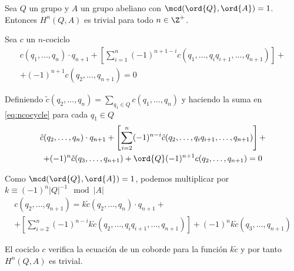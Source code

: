 \begin{lema}%
	Sea $Q$ un grupo y $A$ un grupo abeliano con $\mcd(\ord{Q}, \ord{A}) = 1$. Entonces $H^n(Q,A)$ es trivial para todo $n\in\Z^+$.
	\begin{demostracion}
		Sea $c$ un $n$-cociclo
		\begin{multline}\label{eq:ncocycle}
			c(q_1,\hdots,q_n)\cdot q_{n+1} + \left[\sum\limits_{i=1}^{n}(-1)^{n+1-i} c(q_1,\hdots,q_iq_{i+1},\hdots,q_{n+1}) \right] + \\ + (-1)^{n+1}c(q_2,\hdots,q_{n+1}) = 0
		\end{multline}
		
		Definiendo $\tilde c(q_2,\hdots,q_{n}) = {\displaystyle \sum_{q_1\in Q} c(q_1,\hdots,q_{n})}$ y haciendo la suma en \eqref{eq:ncocycle} para cada $q_1 \in Q$
		\begin{multline*}
			\tilde c(q_2,\hdots,q_n)\cdot q_{n+1} + \left[\sum\limits_{i=2}^{n}(-1)^{n-i}\tilde c(q_2,\hdots,q_iq_{i+1},\hdots,q_{n+1}) \right] +\\+ (-1)^n\tilde c(q_3,\hdots,q_{n+1})+ \ord{Q}(-1)^{n+1} c(q_2,\hdots,q_{n+1}) = 0
		\end{multline*}
		
		Como $\mcd(\ord{Q}, \ord{A}) = 1$, podemos multiplicar por $k \equiv (-1)^n|Q|^{-1} \mod |A|$
		\begin{multline*}
			c(q_2,\hdots,q_{n+1}) = k\tilde c(q_2,\hdots,q_n)\cdot q_{n+1} +\\+ \left[\sum\limits_{i=2}^{n}(-1)^{n-i}k\tilde c(q_2,\hdots,q_iq_{i+1},\hdots,q_{n+1}) \right] + (-1)^nk\tilde c(q_3,\hdots,q_{n+1})
		\end{multline*}
		
		El cociclo $c$ verifica la ecuación de un coborde para la función $k \tilde c$ y por tanto $H^n(Q,A)$ es trivial.
		
		
	\end{demostracion}
\end{lema}

